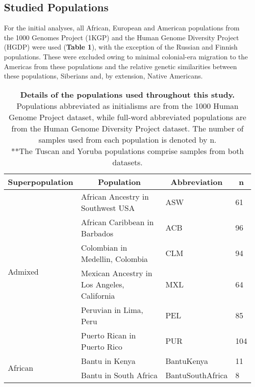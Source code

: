 \documentclass[11pt]{article}
\begin{document}
\subsection{Studied Populations}


For the initial analyses, all African, European and American populations from the 1000 Genomes Project (1KGP) and the Human Genome Diversity Project (HGDP) were used (\textbf{Table 1}), with the exception of the Russian and Finnish populations. These were excluded owing to minimal colonial-era migration to the Americas from these populations and the relative genetic similarities between these populations, Siberians and, by extension, Native Americans.



\begin{table}[htb]
    \centering
    \caption{
        \textbf{Details of the populations used throughout this study.} 
        Populations abbreviated as initialisms are from the 1000 Human Genome Project dataset, while full-word abbreviated populations are from the Human Genome Diversity Project dataset. The number of samples used from each population is denoted by n. \\
        **The Tuscan and Yoruba populations comprise samples from both datasets.
        }
    \vspace{.2cm}
    \small
    \begin{tabular}{ |p{3cm}||p{8cm}|p{3cm}|p{0.8cm}|  }
    \hline
    \multicolumn{1}{|c||}{\textbf{Superpopulation}} &
    \multicolumn{1}{c|}{\textbf{Population}} & 
    \multicolumn{1}{c|}{\textbf{Abbreviation}} & %
    \multicolumn{1}{c|}{\textbf{n}}\\
    \hline
    \hline
    \multirow{6}{*}{Admixed}  %
        &African Ancestry in Southwest USA & ASW & 61 \\
        &African Caribbean in Barbados & ACB & 96 \\
        &Colombian in Medellin, Colombia & CLM & 94 \\
        &Mexican Ancestry in Los Angeles, California & MXL & 64 \\
        &Peruvian in Lima, Peru & PEL & 85 \\
        &Puerto Rican in Puerto Rico & PUR & 104 \\
        \hline
    \multirow{11}{*}{African}
        &Bantu in Kenya & BantuKenya & 11 \\
        &Bantu in South Africa & BantuSouthAfrica & 8 \\

\end{tabular}
\end{table}
\end{document}

